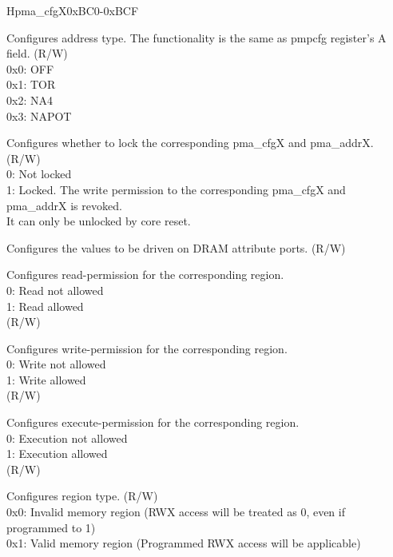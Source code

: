 
\begin{register}{H}{pma\_cfgX}{0xBC0-0xBCF}
\label{regdesc:pma_cfgX}
%
%
%
%
%
%
%
%
%
%
\regnewline%
\begin{regdesc}
\begin{reglist}
\label{fielddesc:A}\item [A] Configures address type. The functionality is the same as pmpcfg register's A field. (R/W)\\
0x0: OFF\\
0x1: TOR\\
0x2: NA4\\
0x3: NAPOT\\
\label{fielddesc:LOCK}\item [LOCK] Configures whether to lock the corresponding pma\_cfgX and pma\_addrX. (R/W)\\
0: Not locked\\
1: Locked. The write permission to the corresponding pma\_cfgX and pma\_addrX is revoked.\\
It can only be unlocked by core reset.
\label{fielddesc:ATTRIBUTE}\item [ATTRIBUTE] Configures the values to be driven on DRAM attribute ports. (R/W)
\label{fielddesc:READ}\item [READ] Configures read-permission for the corresponding region.\\
0: Read not allowed\\
1: Read allowed\\
 (R/W)
\label{fielddesc:WRITE}\item [WRITE] Configures write-permission for the corresponding region.\\
0: Write not allowed\\
1: Write allowed\\
 (R/W)
\label{fielddesc:EXECUTE}\item [EXECUTE] Configures execute-permission for the corresponding region.\\
0: Execution not allowed\\
1: Execution allowed\\
 (R/W)
\label{fielddesc:TYPE}\item [TYPE] Configures region type. (R/W)\\
0x0: Invalid memory region (RWX access will be treated as 0, even if programmed to 1)\\
0x1: Valid memory region (Programmed RWX access will be applicable)\\
\end{reglist}
\end{regdesc}
\end{register}

